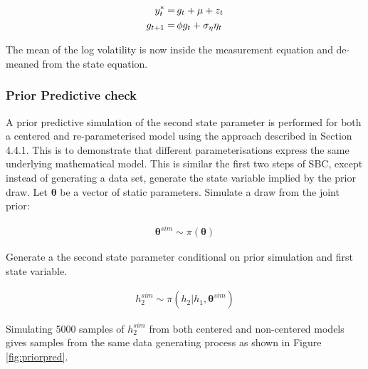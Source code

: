 \documentclass[12pt, a4paper]{article}
\begin{document}
        $$
        \begin{aligned}
        y^{\ast}_t =& \space \, g_t + \mu + z_t \\
        g_{t+1} =& \space \, \phi g_t + \sigma_{\eta}\eta_{t}
        \end{aligned}
        $$

        The mean of the log volatility is now inside the measurement equation and de-meaned from the state equation.
    
    \subsubsection{Prior Predictive check}
        A prior predictive simulation of the second state parameter is performed for both a centered and re-parameterised model using the approach described in Section 4.4.1. This is to demonstrate that different parameterisations express the same underlying mathematical model. This is similar the first two steps of SBC, except instead of generating a data set, generate the state variable implied by the prior draw. Let $\boldsymbol{\theta}$ be a vector of static parameters. Simulate a draw from the joint prior:

        $$
        \begin{aligned}
        \boldsymbol{\theta}^{sim} \sim \pi(\boldsymbol{\theta})
        \end{aligned}
        $$

        Generate a the second state parameter conditional on prior simulation and first state variable.

        $$
        \begin{aligned}
        h_2^{sim} \sim \pi (h_2|h_1, \boldsymbol{\theta}^{sim})
        \end{aligned}
        $$

        Simulating 5000 samples of $h_2^{sim}$ from both centered and non-centered models gives samples from the same data generating process as shown in Figure \ref{fig:priorpred}. 
\end{document}
